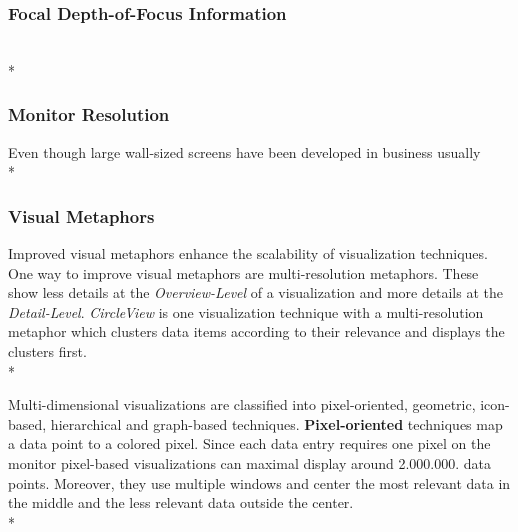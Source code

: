\subsubsection*{Focal Depth-of-Focus Information}
\\*
\subsubsection*{Monitor Resolution}
Even though large wall-sized screens have been developed in business usually 
\\*
\subsubsection*{Visual Metaphors}
Improved visual metaphors enhance the scalability of visualization techniques\cite{Eick2002}.  One way to improve visual metaphors are multi-resolution metaphors\cite{Keim2005}. These show less details at the \textit{Overview-Level} of a visualization and more details at the \textit{Detail-Level}. \textit{CircleView} is one visualization technique with a multi-resolution metaphor which clusters data items according to their relevance and displays the clusters first.
\\*

Multi-dimensional visualizations are classified into pixel-oriented, geometric, icon-based, hierarchical and graph-based techniques\cite{Keim2000}.
\textbf{Pixel-oriented} techniques map a data point to a colored pixel. Since each data entry requires one pixel on the monitor pixel-based visualizations can maximal display around 2.000.000. data points. Moreover, they use multiple windows and center the most relevant data in the middle and the less relevant data outside the center\cite{Keim1996}.\\*

